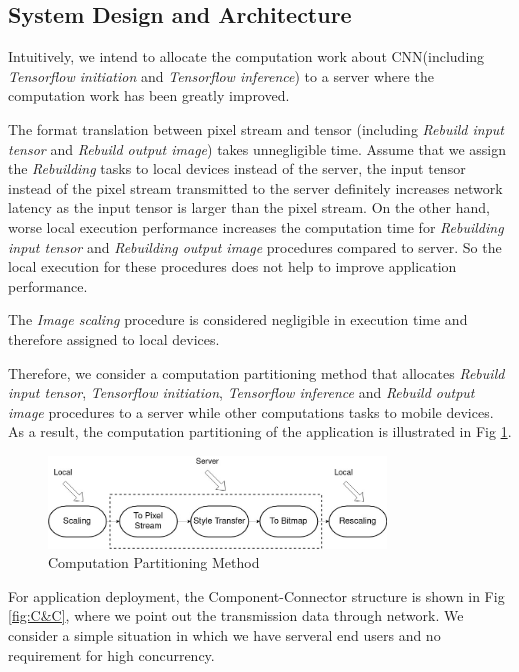 \documentclass[a4paper,12pt,onecolumn,twoside]{article}
\begin{document}
\begin{CJK*}{GBK}{song}
\subsection{System Design and Architecture}

Intuitively, we intend to allocate the computation
work about CNN(including \textit{Tensorflow initiation}
and \textit{Tensorflow inference}) 
to a server where 
the computation work has been greatly improved.

The format translation between pixel stream and tensor
(including \textit{Rebuild input tensor} and 
\textit{Rebuild output image})
takes unnegligible time. 
Assume that we assign the \textit{Rebuilding} tasks 
to local devices instead of the server, 
the input tensor instead of the pixel stream transmitted
to the server definitely increases network latency as the
input tensor is larger than the pixel stream. 
On the other hand, worse local execution performance increases
the computation time for \textit{Rebuilding input tensor}
and \textit{Rebuilding output image} procedures compared to 
server. So the local execution for these procedures does not 
help to improve application performance.

The \textit{Image scaling} procedure is considered negligible
in execution time
and therefore assigned to local devices.

Therefore, we consider a computation partitioning method that
allocates \textit{Rebuild input tensor}, 
\textit{Tensorflow initiation}, \textit{Tensorflow inference} 
and \textit{Rebuild output image} procedures 
to a server while other computations tasks to mobile devices.
As a result, the computation partitioning 
of the application is illustrated in Fig \ref{fig:partition}.


 \begin{figure}[!hbt]
   \centering
   \includegraphics[width=0.8\textwidth]{uses-partition}
    \caption{Computation Partitioning Method}
    \label{fig:partition}
 \end{figure}

 For application deployment, the Component-Connector structure
 is shown in Fig \ref{fig:C&C}, where we point out the transmission data
 through network. We consider a simple situation in which we have serveral
 end users and no requirement for high concurrency. 


\end{CJK*}
\end{document}
